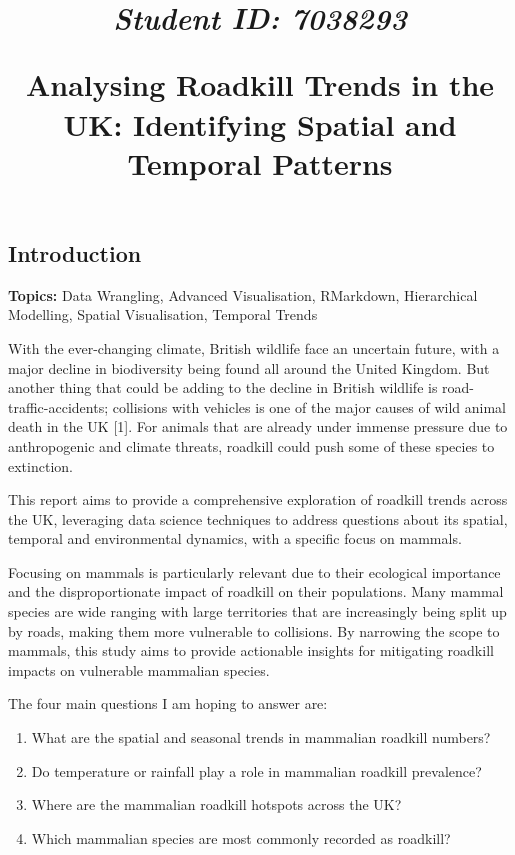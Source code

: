 \documentclass[
]{article}
\title{\vspace{-2cm}
\begin{flushright}
{\small \textit{Student ID: 7038293}}
\end{flushright}

Analysing Roadkill Trends in the UK: Identifying Spatial and Temporal
Patterns}
\author{}
\date{\vspace{-2.5em}}
\begin{document}
\maketitle

\subsection{Introduction}\label{introduction}

\textbf{Topics:} Data Wrangling, Advanced Visualisation, RMarkdown,
Hierarchical Modelling, Spatial Visualisation, Temporal Trends

With the ever-changing climate, British wildlife face an uncertain
future, with a major decline in biodiversity being found all around the
United Kingdom. But another thing that could be adding to the decline in
British wildlife is road-traffic-accidents; collisions with vehicles is
one of the major causes of wild animal death in the UK {[}1{]}. For
animals that are already under immense pressure due to anthropogenic and
climate threats, roadkill could push some of these species to
extinction.

This report aims to provide a comprehensive exploration of roadkill
trends across the UK, leveraging data science techniques to address
questions about its spatial, temporal and environmental dynamics, with a
specific focus on mammals.

Focusing on mammals is particularly relevant due to their ecological
importance and the disproportionate impact of roadkill on their
populations. Many mammal species are wide ranging with large territories
that are increasingly being split up by roads, making them more
vulnerable to collisions. By narrowing the scope to mammals, this study
aims to provide actionable insights for mitigating roadkill impacts on
vulnerable mammalian species.

The four main questions I am hoping to answer are:

\begin{enumerate}
\def\labelenumi{\arabic{enumi}.}
\item
  What are the spatial and seasonal trends in mammalian roadkill
  numbers?
\item
  Do temperature or rainfall play a role in mammalian roadkill
  prevalence?
\item
  Where are the mammalian roadkill hotspots across the UK?
\item
  Which mammalian species are most commonly recorded as roadkill?
\end{enumerate}
\end{document}
